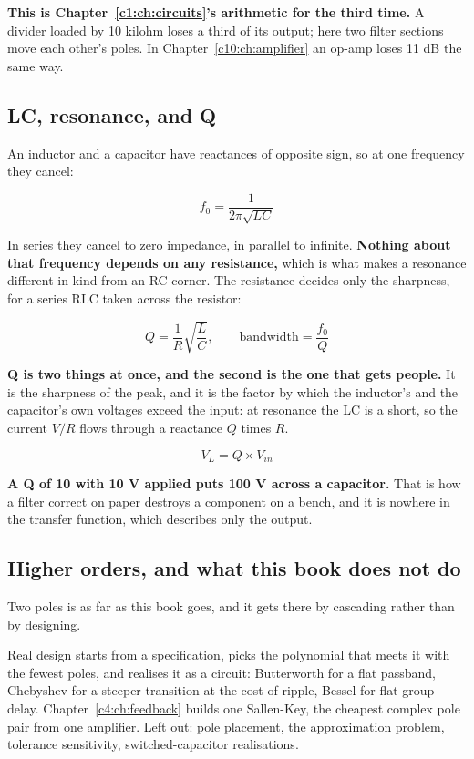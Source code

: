 \textbf{This is Chapter~\ref{c1:ch:circuits}'s arithmetic for the third time.} A divider loaded by 10 kilohm loses a third of its output; here two filter sections move each other's poles. In Chapter~\ref{c10:ch:amplifier} an op-amp loses 11 dB the same way.

\subsection{LC, resonance, and Q}
\label{c3:sec:a4}
An inductor and a capacitor have reactances of opposite sign, so at one frequency they cancel:

\[
  f_0 = \frac{1}{2\pi\sqrt{LC}}
\]

In series they cancel to zero impedance, in parallel to infinite. \textbf{Nothing about that frequency depends on any resistance,} which is what makes a resonance different in kind from an RC corner. The resistance decides only the sharpness, for a series RLC taken across the resistor:

\[
  Q = \frac{1}{R}\sqrt{\frac{L}{C}}, \qquad \text{bandwidth} = \frac{f_0}{Q}
\]


\textbf{Q is two things at once, and the second is the one that gets people.} It is the sharpness of the peak, and it is the factor by which the inductor's and the capacitor's own voltages exceed the input: at resonance the LC is a short, so the current $V/R$ flows through a reactance $Q$ times $R$.

\[
  V_L = Q \times V_{in}
\]

\textbf{A Q of 10 with 10 V applied puts 100 V across a capacitor.} That is how a filter correct on paper destroys a component on a bench, and it is nowhere in the transfer function, which describes only the output.

\subsection{Higher orders, and what this book does not do}
\label{c3:sec:a5}
Two poles is as far as this book goes, and it gets there by cascading rather than by designing.

Real design starts from a specification, picks the polynomial that meets it with the fewest poles, and realises it as a circuit: Butterworth for a flat passband, Chebyshev for a steeper transition at the cost of ripple, Bessel for flat group delay. Chapter~\ref{c4:ch:feedback} builds one Sallen-Key, the cheapest complex pole pair from one amplifier. Left out: pole placement, the approximation problem, tolerance sensitivity, switched-capacitor realisations.

